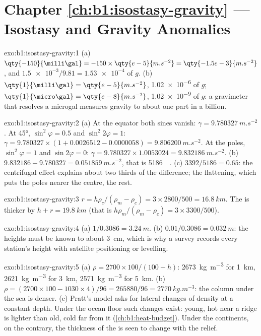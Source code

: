\section*{Chapter \ref{ch:b1:isostasy-gravity} --- Isostasy and Gravity Anomalies}

\begin{solution}{exo:b1:isostasy-gravity:1}
(a) $\qty{-150}{\milli\gal} = -150\times\qty{e-5}{m.s^{-2}} = \qty{-1.5e-3}{m.s^{-2}}$,
and $\num{1.5e-3}/9.81 = \num{1.53e-4}$ of $g$. (b) $\qty{1}{\milli\gal} =
\qty{e-5}{m.s^{-2}}$, \num{1.02e-6} of $g$; $\qty{1}{\micro\gal} =
\qty{e-8}{m.s^{-2}}$, \num{1.02e-9} of $g$: a gravimeter that resolves a
microgal measures gravity to about one part in a billion.
\end{solution}

\begin{solution}{exo:b1:isostasy-gravity:2}
(a) At the equator both sines vanish: $\gamma = \qty{9.780327}{m.s^{-2}}$. At
\ang{45}, $\sin^2\varphi = 0.5$ and $\sin^2 2\varphi = 1$:
$\gamma = 9.780327\times(1 + 0.0026512 - 0.0000058) = \qty{9.806200}{m.s^{-2}}$.
At the poles, $\sin^2\varphi = 1$ and $\sin 2\varphi = 0$:
$\gamma = 9.780327\times1.0053024 = \qty{9.832186}{m.s^{-2}}$.
(b) $9.832186 - 9.780327 = \qty{0.051859}{m.s^{-2}}$, that is
\qty{5186}{\milli\gal}. (c) $3392/5186 = 0.65$: the centrifugal effect explains
about two thirds of the difference; the flattening, which puts the poles nearer
the centre, the rest.
\end{solution}

\begin{solution}{exo:b1:isostasy-gravity:3}
$r = h\rho_c/(\rho_m - \rho_c) = 3\times2800/500 = \qty{16.8}{km}$. The  is
thicker by $h + r = \qty{19.8}{km}$ (that is $h\rho_m/(\rho_m - \rho_c) =
3\times3300/500$).
\end{solution}

\begin{solution}{exo:b1:isostasy-gravity:4}
(a) $1/0.3086 = \qty{3.24}{m}$. (b) $0.01/0.3086 = \qty{0.032}{m}$: the heights
must be known to about \qty{3}{cm}, which is why a survey records every
station's height with satellite positioning or levelling.
\end{solution}

\begin{solution}{exo:b1:isostasy-gravity:5}
(a) $\rho = 2700\times100/(100 + h)$: \qty{2673}{kg.m^{-3}} for \qty{1}{km},
\qty{2621}{kg.m^{-3}} for \qty{3}{km}, \qty{2571}{kg.m^{-3}} for \qty{5}{km}.
(b) $\rho = (2700\times100 - 1030\times4)/96 = \num{265880}/96 =
\qty{2770}{kg.m^{-3}}$: the column under the sea is denser. (c) Pratt's model
asks for lateral changes of density at a constant depth. Under the ocean floor
such changes exist: young, hot  near a ridge is lighter than old,
cold  far from it (\cref{ch:b1:heat-budget}). Under the continents,
on the contrary, the thickness of the  is seen to change with the relief.
\end{solution}

